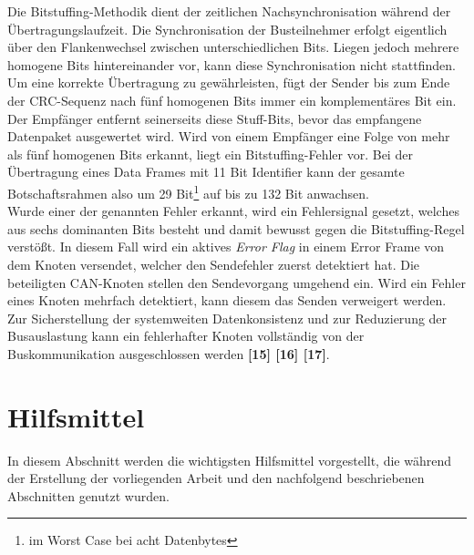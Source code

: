 Die Bitstuffing-Methodik dient der zeitlichen Nachsynchronisation während der Übertragungslaufzeit. Die Synchronisation der Busteilnehmer erfolgt eigentlich über den Flankenwechsel zwischen unterschiedlichen Bits. Liegen jedoch mehrere homogene Bits hintereinander vor, kann diese Synchronisation nicht stattfinden. Um eine korrekte Übertragung zu gewährleisten, fügt der Sender bis zum Ende der \acs{CRC}-Sequenz nach fünf homogenen Bits immer ein komplementäres Bit ein. Der Empfänger entfernt seinerseits diese Stuff-Bits, bevor das empfangene Datenpaket ausgewertet wird. Wird von einem Empfänger eine Folge von mehr als fünf homogenen Bits erkannt, liegt ein Bitstuffing-Fehler vor. Bei der Übertragung eines Data Frames mit 11 Bit Identifier kann der gesamte Botschaftsrahmen also um 29 Bit\footnote{im Worst Case bei acht Datenbytes} auf bis zu 132 Bit anwachsen. \\
Wurde einer der genannten Fehler erkannt, wird ein Fehlersignal gesetzt, welches aus sechs dominanten Bits besteht und damit bewusst gegen die Bitstuffing-Regel verstößt. In diesem Fall wird ein aktives \emph{Error Flag} in einem Error Frame von dem Knoten versendet, welcher den Sendefehler zuerst detektiert hat. Die beteiligten \acs{CAN}-Knoten stellen den Sendevorgang umgehend ein. Wird ein Fehler eines Knoten mehrfach detektiert, kann diesem das Senden verweigert werden. Zur Sicherstellung der systemweiten Datenkonsistenz und zur Reduzierung der Busauslastung kann ein fehlerhafter Knoten vollständig von der Buskommunikation ausgeschlossen werden \textbf{[15] [16] [17]}.


\section{Hilfsmittel} \label{sec:Hilfsmittel} %
In diesem Abschnitt werden die wichtigsten Hilfsmittel vorgestellt, die während der Erstellung der vorliegenden Arbeit und den nachfolgend beschriebenen Abschnitten genutzt wurden.

